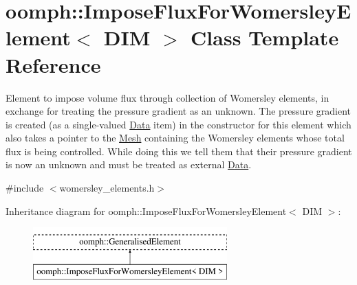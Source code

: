 \hypertarget{classoomph_1_1ImposeFluxForWomersleyElement}{}\section{oomph\+:\+:Impose\+Flux\+For\+Womersley\+Element$<$ D\+IM $>$ Class Template Reference}
\label{classoomph_1_1ImposeFluxForWomersleyElement}


Element to impose volume flux through collection of Womersley elements, in exchange for treating the pressure gradient as an unknown. The pressure gradient is created (as a single-\/valued \hyperlink{classoomph_1_1Data}{Data} item) in the constructor for this element which also takes a pointer to the \hyperlink{classoomph_1_1Mesh}{Mesh} containing the Womersley elements whose total flux is being controlled. While doing this we tell them that their pressure gradient is now an unknown and must be treated as external \hyperlink{classoomph_1_1Data}{Data}.  




{\ttfamily \#include $<$womersley\+\_\+elements.\+h$>$}

Inheritance diagram for oomph\+:\+:Impose\+Flux\+For\+Womersley\+Element$<$ D\+IM $>$\+:\begin{figure}[H]
\begin{center}
\leavevmode
\includegraphics[height=2.000000cm]{classoomph_1_1ImposeFluxForWomersleyElement}
\end{center}
\end{figure}
